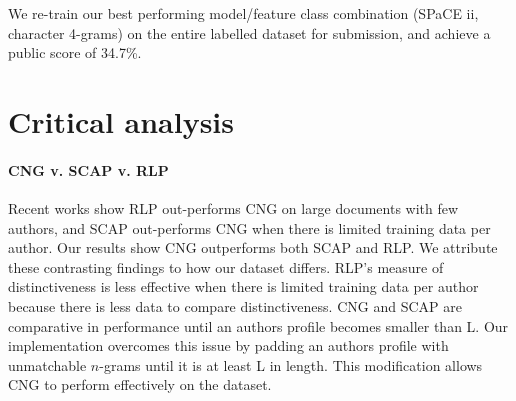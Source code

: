 \documentclass[twocolumn,10pt]{article}
\begin{document}
We re-train our best performing model/feature class combination
(SPaCE ii, character 4-grams) on the entire labelled dataset for submission,
and achieve a public score of 34.7\%.

\section{Critical analysis}



\paragraph{CNG v. SCAP v. RLP} Recent works show RLP out-performs CNG on large documents with few authors\supercite{layton2012recentred}, and SCAP out-performs CNG when there is limited training data per author\supercite{frantzeskou2006effective}. Our results show CNG outperforms both SCAP and RLP. We attribute these contrasting findings to how our dataset differs. RLP's measure of distinctiveness is less effective when there is limited training data per author because there is less data to compare distinctiveness. CNG and SCAP are comparative in performance until an authors profile becomes smaller than L\supercite{frantzeskou2006effective}. Our implementation overcomes this issue by padding an authors profile with unmatchable $n$-grams until it is at least L in length. This modification allows CNG to perform effectively on the dataset.
\end{document}
